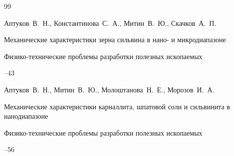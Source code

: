 \begin{thebibliography}{99}











\by Аптуков~В.~Н., Константинова~С.~А., Митин~В.~Ю., Скачков~А.~П.

\paper Механические характеристики зерна сильвина в нано- и микродиапазоне

\jour Физико-технические проблемы разработки полезных ископаемых



--43

















\by Аптуков~В.~Н., Митин~В.~Ю., Молоштанова~Н.~Е., Морозов~И.~А.

\paper Механические характеристики карналлита, шпатовой соли и сильвинита в нанодиапазоне 

\jour Физико-технические проблемы разработки полезных ископаемых 



--56



\end{thebibliography}

